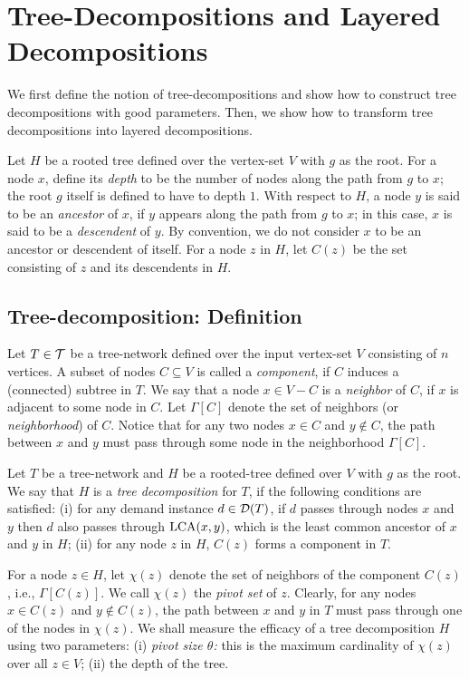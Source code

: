 \documentclass[11pt]{article}
\newcommand{\calT} {{\cal T}}
\newcommand{\calD} {{\cal D}}
\newcommand{\LCA} {{\rm LCA}}
\begin{document}
\section{Tree-Decompositions and Layered Decompositions}
We first define the notion of tree-decompositions and show how to
construct tree decompositions with good parameters. 
Then, we show how to transform tree decompositions into layered decompositions.

Let $H$ be a rooted tree defined over the vertex-set $V$ with $g$ as the root.
For a node $x$, define its {\em depth} to be the number
of nodes along the path from $g$ to $x$; the root $g$ itself is defined to have to depth $1$.
With respect to $H$, a node $y$ is said to be an {\em ancestor} of $x$,
if $y$ appears along the path from $g$ to $x$; in this case, $x$ is said to be a {\em descendent} of $y$.
By convention, we do not consider $x$ to be an ancestor or descendent of itself.
For a node $z$ in $H$, let $C(z)$ be the set consisting of $z$ and its descendents in $H$.

\subsection{Tree-decomposition: Definition}
Let $T\in \calT$ be a tree-network defined over the input vertex-set $V$ consisting of $n$ vertices.
A subset of nodes $C\subseteq V$ is called a {\em component}, if $C$ induces a (connected) subtree in $T$.
We say that a node $x\in V-C$ is a {\em neighbor} of $C$, if $x$ is adjacent to some node in $C$.
Let $\Gamma[C]$ denote the set of neighbors (or {\em neighborhood}) of $C$.
Notice that for any two nodes $x\in C$ and $y\not\in C$, the path between $x$ and $y$ must pass through 
some node in the neighborhood $\Gamma[C]$.

Let $T$ be a tree-network and $H$ be a rooted-tree defined over $V$ with $g$ as the root.
We say that $H$ is a {\em tree decomposition} for $T$, 
if the following conditions are satisfied: 
(i) for any demand instance $d\in \calD(T)$, if $d$ passes through nodes $x$ and $y$ then $d$ also passes through
$\LCA(x,y)$, which is the least common ancestor of $x$ and $y$ in $H$;
(ii) for any node $z$ in $H$, $C(z)$ forms a component in $T$.

For a node $z\in H$, let $\chi(z)$ denote the set of neighbors of the component $C(z)$, i.e., $\Gamma[C(z)]$.
We call $\chi(z)$ the {\em pivot set} of $z$.
Clearly, for any nodes $x\in C(z)$ and $y\not\in C(z)$, the path between $x$ and $y$ in $T$ must 
pass through one of the nodes in $\chi(z)$.
We shall measure the efficacy of a tree decomposition $H$ using two parameters:
(i) {\em pivot size $\theta$: } this is the maximum cardinality of $\chi(z)$ over all $z\in V$;
(ii) the depth of the tree. 
\end{document}
